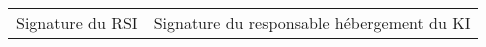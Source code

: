 \documentclass{ki019}
\begin{document}
\pagestyle{empty}

\noindent

\section{}

\begin{center}


\end{center}

\vspace{-0.5cm}
\noindent
{}

\vspace{0.5cm}
\Large
\begin{tabular}{p{6cm}p{9.5cm}}
Signature du RSI & Signature du responsable hébergement du KI
\end{tabular}

\Footer{\today}
\end{document}
